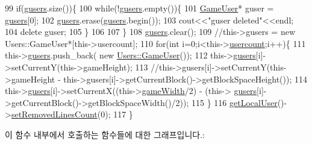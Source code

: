 \begin{DoxyCode}
99                 \textcolor{keywordflow}{if}(\hyperlink{class_tetris_1_1_game_controller_a1a31d3a933daad6d95e20458eea2900e}{gusers}.size())\{
100                     \textcolor{keywordflow}{while}(!\hyperlink{class_tetris_1_1_game_controller_a1a31d3a933daad6d95e20458eea2900e}{gusers}.empty())\{
101                         \hyperlink{class_tetris_1_1_users_1_1_game_user}{GameUser}* guser = \hyperlink{class_tetris_1_1_game_controller_a1a31d3a933daad6d95e20458eea2900e}{gusers}[0];
102                         \hyperlink{class_tetris_1_1_game_controller_a1a31d3a933daad6d95e20458eea2900e}{gusers}.erase(\hyperlink{class_tetris_1_1_game_controller_a1a31d3a933daad6d95e20458eea2900e}{gusers}.begin());
103                         cout<<\textcolor{stringliteral}{"guser deleted"}<<endl;
104                         \textcolor{keyword}{delete} guser;
105                     \}
106                     
107                 \}
108                  \hyperlink{class_tetris_1_1_game_controller_a1a31d3a933daad6d95e20458eea2900e}{gusers}.clear();
109                     \textcolor{comment}{//this->gusers = new Users::GameUser*[this->usercount];}
110                     \textcolor{keywordflow}{for}(\textcolor{keywordtype}{int} i=0;i<this->\hyperlink{class_tetris_1_1_game_controller_aafb18b3b4fe5621bfb60fc42b1e8da09}{usercount};i++)\{
111                         this->\hyperlink{class_tetris_1_1_game_controller_a1a31d3a933daad6d95e20458eea2900e}{gusers}.push\_back( \textcolor{keyword}{new} \hyperlink{class_tetris_1_1_users_1_1_game_user}{Users::GameUser}());
112                         this->\hyperlink{class_tetris_1_1_game_controller_a1a31d3a933daad6d95e20458eea2900e}{gusers}[i]->setCurrentY(this->gameHeight);
113                         \textcolor{comment}{//this->gusers[i]->setCurrentY(this->gameHeight -
       this->gusers[i]->getCurrentBlock()->getBlockSpaceHeight());}
114                         this->\hyperlink{class_tetris_1_1_game_controller_a1a31d3a933daad6d95e20458eea2900e}{gusers}[i]->setCurrentX((this->\hyperlink{class_tetris_1_1_game_controller_a439f215918db4127fcb44cf9d501ed63}{gameWidth}/2) - (this->
      \hyperlink{class_tetris_1_1_game_controller_a1a31d3a933daad6d95e20458eea2900e}{gusers}[i]->getCurrentBlock()->getBlockSpaceWidth()/2));
115                     \}
116                 \hyperlink{class_tetris_1_1_game_controller_abc67d4b309ce2886b43a3b4e0af22abc}{getLocalUser}()->\hyperlink{class_tetris_1_1_users_1_1_game_user_a298debc64e974b4f626e8f77687ea503}{setRemovedLinesCount}(0);
117             \}
\end{DoxyCode}
이 함수 내부에서 호출하는 함수들에 대한 그래프입니다.\+:
